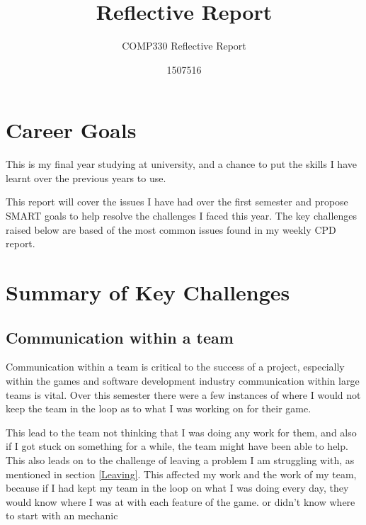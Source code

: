 \documentclass{scrartcl}
\title{Reflective Report}
\subtitle{COMP330 Reflective Report}
\author{1507516}
\begin{document}
\maketitle


\section{Career Goals}
This is my final year studying at university, and a chance to put the skills I have learnt over the previous years to use. 

This report will cover the issues I have had over the first semester and propose SMART goals to help resolve the challenges I faced this year.
The key challenges raised below are based of the most common issues found in my weekly CPD report.


\section{Summary of Key Challenges}


\subsection{Communication within a team}

Communication within a team is critical to the success of a project, especially within the games and software development industry communication within large teams is vital.
Over this semester there were a few instances of where I would not keep the team in the loop as to what I was working on for their game.

\par

This lead to the team not thinking that I was doing any work for them, and also if I got stuck on something for a while, the team might have been able to help.
This also leads on to the challenge of leaving a problem I am struggling with, as mentioned in section \ref{Leaving}.
This affected my work and the work of my team, because if I had kept my team in the loop on what I was doing every day, they would know where I was at with each feature of the game.
or didn't know where to start with an mechanic 
\par
\end{document}
